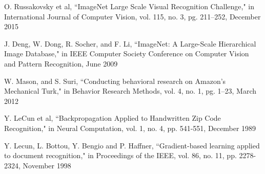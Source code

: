 \begin{thebibliography}{1}
O. Russakovsky et al, ``ImageNet Large Scale Visual Recognition Challenge," in International Journal of Computer Vision, vol. 115, no. 3, pg. 211--252, December 2015

J. Deng, W. Dong, R. Socher, and F. Li, ``ImageNet: A Large-Scale Hierarchical Image Database," in IEEE Computer Society Conference on Computer Vision and Pattern Recognition, June 2009

W. Mason, and S. Suri, ``Conducting behavioral research on Amazon’s Mechanical Turk," in Behavior Research Methods, vol. 4, no. 1, pg. 1--23, March 2012

Y. LeCun et al, ``Backpropagation Applied to Handwritten Zip Code Recognition," in Neural Computation, vol. 1, no. 4, pp. 541-551, December 1989

Y. Lecun, L. Bottou, Y. Bengio and P. Haffner, ``Gradient-based learning applied to document recognition," in Proceedings of the IEEE, vol. 86, no. 11, pp. 2278-2324, November 1998

\end{thebibliography}
